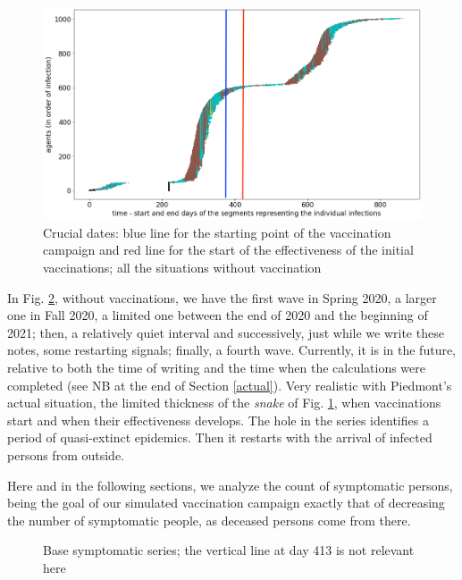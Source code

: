 \documentclass[graybox]{svmult}
\begin{document}
\begin{figure}[t]
\center
\includegraphics[scale=0.2]{CaseForGA_I_base.png}
\caption{Crucial dates: blue line for the starting point of the vaccination campaign and red line for the start of the effectiveness of the initial vaccinations; all the situations without vaccination}
\label{specificCaseGA}
\end{figure}

In Fig. \ref{symptomaticSeries}, without vaccinations, we have the first wave in Spring 2020, a larger one in Fall 2020, a limited one between the end of 2020 and the beginning of 2021; then, a relatively quiet interval and successively, just while we write these notes, some restarting signals; finally, a fourth wave. Currently, it is in the future, relative to both the time of writing and the time when the calculations were completed (see NB at the end of Section \ref{actual}). Very realistic with Piedmont's actual situation, the limited thickness of the \emph{snake} of Fig. \ref{specificCaseGA}, when vaccinations start and when their effectiveness develops. The hole in the series identifies a period of quasi-extinct epidemics. Then it restarts with the arrival of infected persons from outside.

Here and in the following sections, we analyze the count of symptomatic persons, being the goal of our simulated vaccination campaign exactly that of decreasing the number of symptomatic people, as deceased persons come from there.

\begin{figure}[t]
\center
{}
\caption{Base symptomatic series; the vertical line at day 413 is not relevant here} 
\label{symptomaticSeries}
\end{figure}
\end{document}
